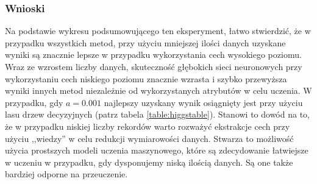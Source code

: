 \subsubsection{Wnioski}
Na podstawie wykresu podsumowującego ten eksperyment, łatwo stwierdzić, że w przypadku wszystkich metod, przy użyciu mniejszej ilości danych uzyskane wyniki są znacznie lepsze w przypadku wykorzystania cech wysokiego poziomu. Wraz ze wzrostem liczby danych, skuteczność głębokich sieci neuronowych przy wykorzystaniu cech niskiego poziomu znacznie wzrasta i szybko przewyższa wyniki innych metod niezależnie od wykorzystanych atrybutów w celu uczenia. W przypadku, gdy $a=0.001$ najlepszy uzyskany wynik osiągnięty jest przy użyciu lasu drzew decyzyjnych (patrz tabela \ref{table:higgstable}). Stanowi to dowód na to, że w przypadku niskiej liczby rekordów warto rozważyć ekstrakcje cech przy użyciu ,,wiedzy'' w celu redukcji wymiarowości danych. Stwarza to możliwość użycia prostszych modeli uczenia maszynowego, które są zdecydowanie łatwiejsze w uczeniu w przypadku, gdy dysponujemy niską ilością danych. Są one także bardziej odporne na przeuczenie.

